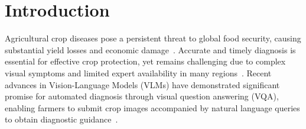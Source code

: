 \documentclass[sigconf,anonymous,review]{acmart}
\begin{document}




\maketitle

\section{Introduction}
\label{sec:introduction}

Agricultural crop diseases pose a persistent threat to global food security, causing substantial yield losses and economic damage~\cite{savary2020modeling,gai2024plant,shahbazi2025losses}. Accurate and timely diagnosis is essential for effective crop protection, yet remains challenging due to complex visual symptoms and limited expert availability in many regions~\cite{upadhyay2025deep,ngugi2024revolutionizing,buja2021advances,mohanty2016using}. Recent advances in Vision-Language Models (VLMs) have demonstrated significant promise for automated diagnosis through visual question answering (VQA), enabling farmers to submit crop images accompanied by natural language queries to obtain diagnostic guidance~\cite{lu2024application,sapkota2025multi}.
\end{document}
